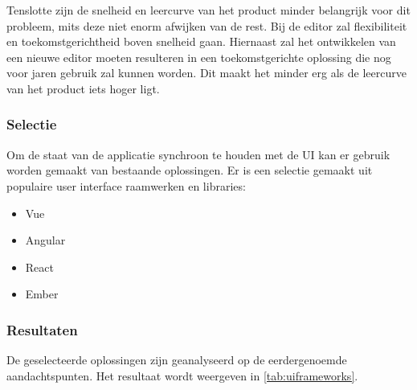 Tenslotte zijn de snelheid en leercurve van het product minder belangrijk voor dit probleem, mits deze niet enorm afwijken van de rest. Bij de editor zal flexibiliteit en toekomstgerichtheid boven snelheid gaan. Hiernaast zal het ontwikkelen van een nieuwe editor moeten resulteren in een toekomstgerichte oplossing die nog voor jaren gebruik zal kunnen worden. Dit maakt het minder erg als de leercurve van het product iets hoger ligt.

\subsubsection{Selectie}
Om de staat van de applicatie synchroon te houden met de UI kan er gebruik worden gemaakt van bestaande oplossingen. Er is een selectie gemaakt uit populaire user interface raamwerken en libraries:
\begin{itemize}
    \item Vue
    \item Angular
    \item React
    \item Ember    
\end{itemize}

\pagebreak
\subsubsection{Resultaten}
De geselecteerde oplossingen zijn geanalyseerd op de eerdergenoemde aandachtspunten. Het resultaat wordt weergeven in \autoref{tab:uiframeworks}.

